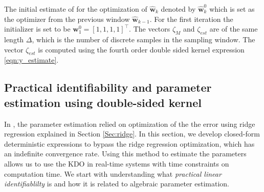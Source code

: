 \documentclass[letterpaper%
, twoside%
, 12pt%
,memoire%
, english%
,creativecommons,hyperref%
]{thETS}
\theoremstyle{newThmStyle}
\begin{document}
The initial estimate of for the optimization of $\mathbf{\hat{w}}_{k}$ denoted by $\mathbf{\hat{w}}_{k}^0$ which is set as the optimizer from the previous window $\mathbf{\hat{w}}_{k-1}$. For the first iteration the initializer is set to be $\mathbf{w}_{1}^{0}= [1, 1, 1, 1]^\intercal$. The vectors $\zeta_M$ and $\zeta_{est}$ are of the same length $\Delta$, which is the number of discrete samples in the sampling window. The vector $\zeta_{est}$ is computed using the fourth order double sided kernel expression \eqref{eqn:y_estimate}.

\subsection{Practical identifiability and parameter estimation using double-sided kernel} \label{Sec:pseudo}
In \citep{RN120}, the parameter estimation relied on optimization of the the error using ridge regression explained in Section \ref{Sec:ridge}. In this section, we develop closed-form deterministic expressions to bypass the ridge regression optimization, which has an indefinite convergence rate. Using this method to estimate the parameters allows us to use the KDO in real-time systems with time constraints on computation time. We start with understanding what \textit{practical linear identifiablilty} is and how it is related to algebraic parameter estimation.  
\end{document}
